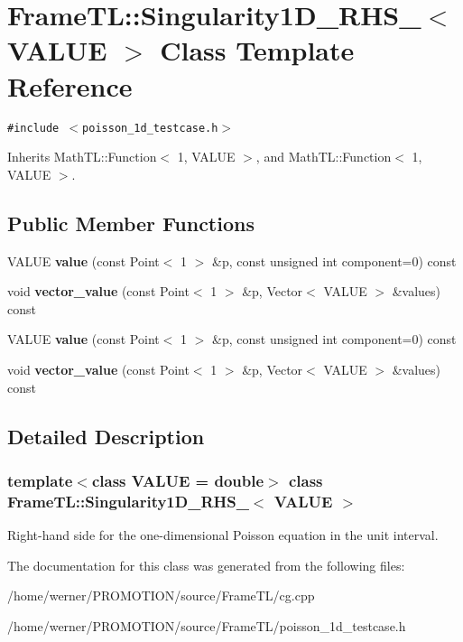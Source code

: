 \hypertarget{classFrameTL_1_1Singularity1D__RHS__2}{
\section{FrameTL::Singularity1D\_\-RHS\_$<$ VALUE $>$ Class Template Reference}
\label{classFrameTL_1_1Singularity1D__RHS__2}
}
{\tt \#include $<$poisson\_\-1d\_\-testcase.h$>$}

Inherits MathTL::Function$<$ 1, VALUE $>$, and MathTL::Function$<$ 1, VALUE $>$.

\subsection*{Public Member Functions}
\begin{CompactItemize}
\item 
\hypertarget{classFrameTL_1_1Singularity1D__RHS__2_b8c94d2a33b4ffbe479954a700bf1d45}{
VALUE \textbf{value} (const Point$<$ 1 $>$ \&p, const unsigned int component=0) const }
\label{classFrameTL_1_1Singularity1D__RHS__2_b8c94d2a33b4ffbe479954a700bf1d45}

\item 
\hypertarget{classFrameTL_1_1Singularity1D__RHS__2_7b90a4cedf2e15d9c5c36895dc4aa56f}{
void \textbf{vector\_\-value} (const Point$<$ 1 $>$ \&p, Vector$<$ VALUE $>$ \&values) const }
\label{classFrameTL_1_1Singularity1D__RHS__2_7b90a4cedf2e15d9c5c36895dc4aa56f}

\item 
\hypertarget{classFrameTL_1_1Singularity1D__RHS__2_b8c94d2a33b4ffbe479954a700bf1d45}{
VALUE \textbf{value} (const Point$<$ 1 $>$ \&p, const unsigned int component=0) const }
\label{classFrameTL_1_1Singularity1D__RHS__2_b8c94d2a33b4ffbe479954a700bf1d45}

\item 
\hypertarget{classFrameTL_1_1Singularity1D__RHS__2_7b90a4cedf2e15d9c5c36895dc4aa56f}{
void \textbf{vector\_\-value} (const Point$<$ 1 $>$ \&p, Vector$<$ VALUE $>$ \&values) const }
\label{classFrameTL_1_1Singularity1D__RHS__2_7b90a4cedf2e15d9c5c36895dc4aa56f}

\end{CompactItemize}


\subsection{Detailed Description}
\subsubsection*{template$<$class VALUE = double$>$ class FrameTL::Singularity1D\_\-RHS\_$<$ VALUE $>$}

Right-hand side for the one-dimensional Poisson equation in the unit interval. 

The documentation for this class was generated from the following files:\begin{CompactItemize}
\item 
/home/werner/PROMOTION/source/FrameTL/cg.cpp\item 
/home/werner/PROMOTION/source/FrameTL/poisson\_\-1d\_\-testcase.h\end{CompactItemize}
